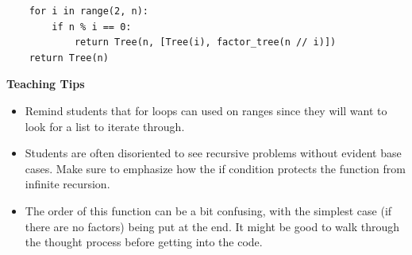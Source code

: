 \begin{blocksection}
\begin{solution}[0.5in]
\begin{lstlisting}
    for i in range(2, n):
        if n % i == 0:
            return Tree(n, [Tree(i), factor_tree(n // i)])
    return Tree(n)
\end{lstlisting}
\end{solution}
\begin{guide}
\textbf{Teaching Tips}
    \begin{itemize}
        \item Remind students that for loops can used on ranges since they will want to look for a list to iterate through.
        \item Students are often disoriented to see recursive problems without evident base cases. Make sure to emphasize how the if condition protects the function from infinite recursion.
        \item The order of this function can be a bit confusing, with the simplest case (if there are no factors) being put at the end. It might be good to walk through the thought process before getting into the code.
    \end{itemize}
\end{guide}
\end{blocksection}
